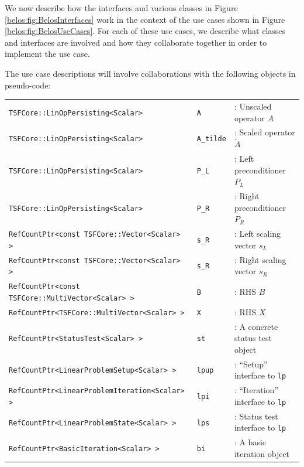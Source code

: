 \documentclass[pdf,ps2pdf,11pt]{SANDreport}
\begin{document}
We now describe how the interfaces and various classes in Figure
{}\ref{belos:fig:BelosInterfaces} work in the context of the use cases
shown in Figure {}\ref{belos:fig:BelosUseCases}.  For each of these
use cases, we describe what classes and interfaces are involved and
how they collaborate together in order to implement the use case.

The use case descriptions will involve collaborations with the
following objects in pseudo-code:

\begin{tabular}{lll}
{\small\texttt{TSFCore::LinOpPersisting<Scalar>}} & {\small\texttt{A}} & : Unscaled operator $A$ \\
{\small\texttt{TSFCore::LinOpPersisting<Scalar>}} & {\small\texttt{A\_tilde}} & : Scaled operator $\tilde{A}$ \\
{\small\texttt{TSFCore::LinOpPersisting<Scalar>}} & {\small\texttt{P\_L}} & : Left preconditioner $P_L$ \\
{\small\texttt{TSFCore::LinOpPersisting<Scalar>}} & {\small\texttt{P\_R}} & : Right preconditioner $P_R$ \\
{\small\texttt{RefCountPtr<const TSFCore::Vector<Scalar> >}} & {\small\texttt{s\_R}} & : Left scaling vector $s_L$ \\
{\small\texttt{RefCountPtr<const TSFCore::Vector<Scalar> >}} & {\small\texttt{s\_R}} & : Right scaling vector $s_R$ \\
{\small\texttt{RefCountPtr<const TSFCore::MultiVector<Scalar> >}} & {\small\texttt{B}} & : RHS $B$ \\
{\small\texttt{RefCountPtr<TSFCore::MultiVector<Scalar> >}} & {\small\texttt{X}} & : RHS $X$ \\
{\small\texttt{RefCountPtr<StatusTest<Scalar> >}} & {\small\texttt{st}} & : A concrete status test object  \\
{\small\texttt{RefCountPtr<LinearProblemSetup<Scalar> >}} & {\small\texttt{lpup}} & : ``Setup'' interface to {}\texttt{lp} \\
{\small\texttt{RefCountPtr<LinearProblemIteration<Scalar> >}} & {\small\texttt{lpi}} & : ``Iteration'' interface to  {}\texttt{lp} \\
{\small\texttt{RefCountPtr<LinearProblemState<Scalar> >}} & {\small\texttt{lps}} & : Status test interface to  {}\texttt{lp} \\
{\small\texttt{RefCountPtr<BasicIteration<Scalar> >}} & {\small\texttt{bi}} & : A basic iteration object
\end{tabular}
\end{document}
